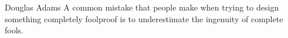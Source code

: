 \vspace*{\fill}

\begin{shadequote}[r]{Douglas Adams}
A common mistake that people make when trying to design something completely foolproof is to underestimate the ingenuity of complete fools.
\end{shadequote}
